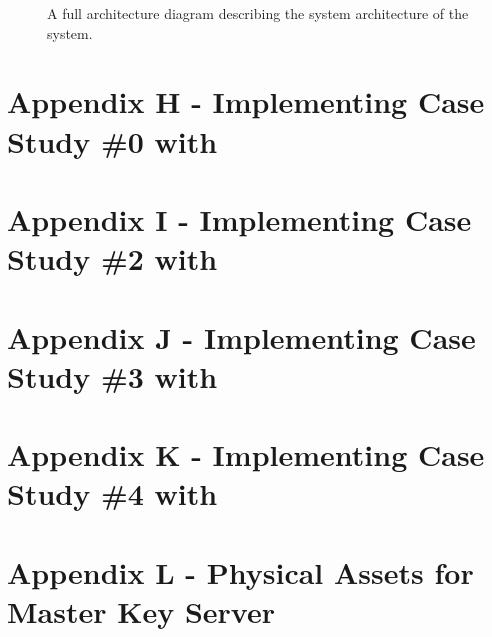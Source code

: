 \begin{appendices}
\begin{figure}[htp]
    \caption{
      A full architecture diagram describing the system architecture of the \theResServer system.
    }

\end{figure}

\clearpage

\section{Appendix H - Implementing Case Study \#0 with \thePolicyLang}
\label{appendix:case_study_0_policy}



\section{Appendix I - Implementing Case Study \#2 with \thePolicyLang}
\label{appendix:case_study_2_policy}



\section{Appendix J - Implementing Case Study \#3 with \thePolicyLang}
\label{appendix:case_study_3_policy}



\section{Appendix K - Implementing Case Study \#4 with \thePolicyLang}
\label{appendix:case_study_4_policy}



\clearpage

\section{Appendix L - Physical Assets for Master Key Server}
\label{appendix:mks_assets}


\end{appendices}
